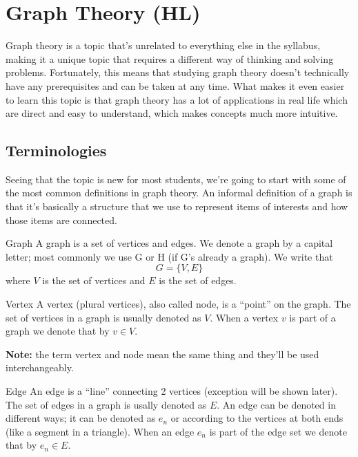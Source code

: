 \chapter{Graph Theory (HL)}
Graph theory is a topic that's unrelated to everything else in the syllabus, making it a unique topic that requires a different way of thinking and solving problems.
Fortunately, this means that studying graph theory doesn't technically have any prerequisites and can be taken at any time.
What makes it even easier to learn this topic is that graph theory has a lot of applications in real life which are direct and easy to understand, which makes concepts much more intuitive.

\section{Terminologies}
Seeing that the topic is new for most students, we're going to start with some of the most common definitions in graph theory.
An informal definition of a graph is that it's basically a structure that we use to represent items of interests and how those items are connected.

\begin{definition}{Graph}
A graph is a set of vertices and edges.
We denote a graph by a capital letter; most commonly we use G or H (if G's already a graph).
We write that
\begin{equation}
    G = \{V, E\}
\end{equation}
where $V$ is the set of vertices and $E$ is the set of edges.
\end{definition}

\begin{definition}{Vertex}
A vertex (plural vertices), also called node, is a ``point'' on the graph.
The set of vertices in a graph is usually denoted as $V$.
When a vertex $v$ is part of a graph we denote that by $v \in V$.

\textbf{Note:} the term vertex and node mean the same thing and they'll be used interchangeably.
\end{definition}

\begin{definition}{Edge}
An edge is a ``line'' connecting 2 vertices (exception will be shown later).
The set of edges in a graph is usally denoted as $E$.
An edge can be denoted in different ways; it can be denoted as $e_n$ or according to the vertices at both ends (like a segment in a triangle).
When an edge $e_n$ is part of the edge set we denote that by $e_n \in E$.
\end{definition}